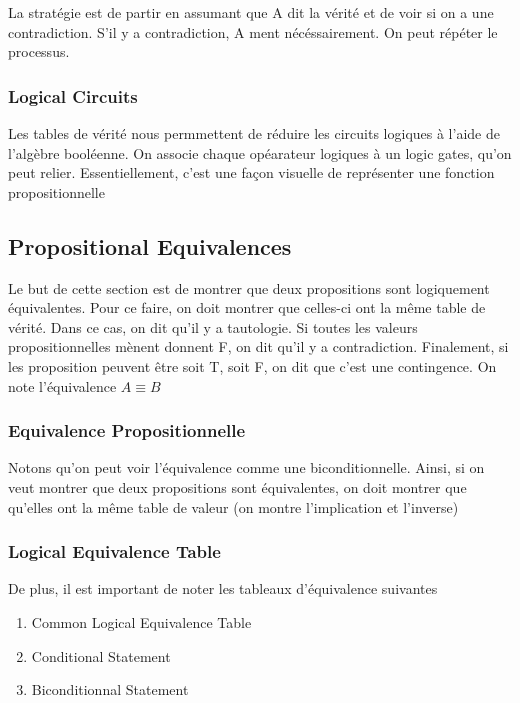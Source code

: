 \documentclass{article}
\begin{document}
La stratégie est de partir en assumant que A dit la vérité et de voir
si on a une contradiction. S'il y a contradiction, A ment nécéssairement.
On peut répéter le processus.

\subsubsection{Logical Circuits}

Les tables de vérité nous permmettent de réduire les circuits logiques
à l'aide de l'algèbre booléenne. On associe chaque opéarateur logiques
à un logic gates, qu'on peut relier. Essentiellement, c'est une façon
visuelle de représenter une fonction propositionnelle

\subsection{Propositional Equivalences}

Le but de cette section est de montrer que deux propositions sont logiquement
équivalentes. Pour ce faire, on doit montrer que celles-ci ont la même
table de vérité. Dans ce cas, on dit qu'il y a tautologie. Si toutes les
valeurs propositionnelles mènent donnent F, on dit qu'il y a contradiction.
Finalement, si les proposition peuvent être soit T, soit F, on dit que
c'est une contingence. On note l'équivalence $ A \equiv B $

\subsubsection{Equivalence Propositionnelle}

Notons qu'on peut voir l'équivalence comme une biconditionnelle. Ainsi,
si on veut montrer que deux propositions sont équivalentes, on doit
montrer que qu'elles ont la même table de valeur (on montre l'implication
et l'inverse)\\

\subsubsection{Logical Equivalence Table}

De plus, il est important de noter les tableaux d'équivalence suivantes
\begin{enumerate}
    \item Common Logical Equivalence Table
    \item Conditional Statement
    \item Biconditionnal Statement
\end{enumerate}
\end{document}
